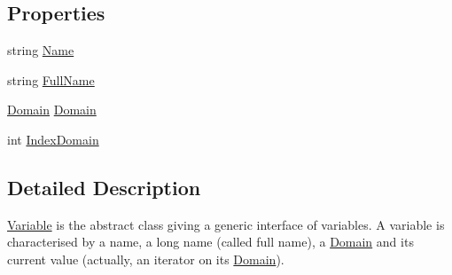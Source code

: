 \subsection*{Properties}
\begin{DoxyCompactItemize}
\item 
string \hyperlink{classghost_1_1Variable_a1dba3848c7675d086eecad078178e4d9}{Name}
\item 
string \hyperlink{classghost_1_1Variable_af20c2f01306cba69f36d32babb703c1d}{Full\-Name}
\item 
\hyperlink{classghost_1_1Domain}{Domain} \hyperlink{classghost_1_1Variable_aae96e8a30ff2f44dc115a0b51e136e92}{Domain}
\item 
int \hyperlink{classghost_1_1Variable_a4fa08b5d46a4559d345d4752e7a790d2}{Index\-Domain}
\end{DoxyCompactItemize}


\subsection{Detailed Description}
\hyperlink{classghost_1_1Variable}{Variable} is the abstract class giving a generic interface of variables. A variable is characterised by a name, a long name (called full name), a \hyperlink{classghost_1_1Domain}{Domain} and its current value (actually, an iterator on its \hyperlink{classghost_1_1Domain}{Domain}). 

